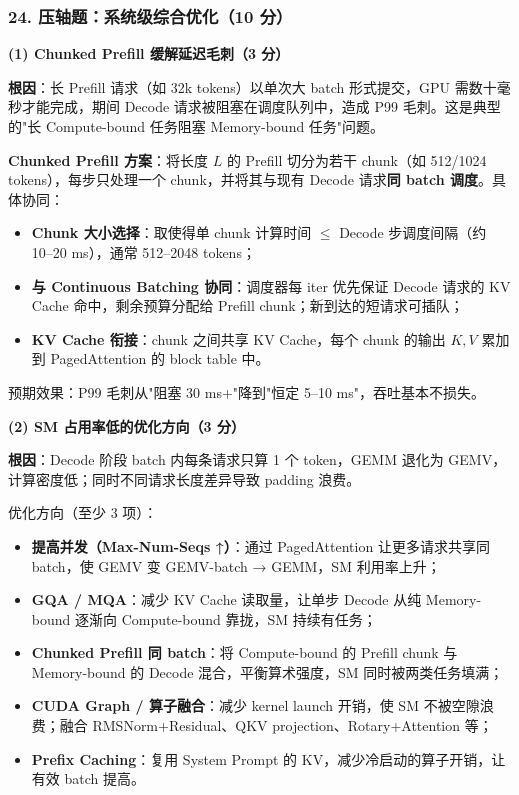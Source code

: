 \documentclass[11pt,a4paper]{article}
\begin{document}
\subsubsection*{24. 压轴题：系统级综合优化（10 分）}

\noindent\textbf{(1) Chunked Prefill 缓解延迟毛刺（3 分）}

\textbf{根因}：长 Prefill 请求（如 32k tokens）以单次大 batch 形式提交，GPU 需数十毫秒才能完成，期间 Decode 请求被阻塞在调度队列中，造成 P99 毛刺。这是典型的"长 Compute-bound 任务阻塞 Memory-bound 任务"问题。

\textbf{Chunked Prefill 方案}：将长度 $L$ 的 Prefill 切分为若干 chunk（如 512/1024 tokens），每步只处理一个 chunk，并将其与现有 Decode 请求\textbf{同 batch 调度}。具体协同：
\begin{itemize}[leftmargin=2em,itemsep=0pt,parsep=0pt,topsep=0pt]
  \item \textbf{Chunk 大小选择}：取使得单 chunk 计算时间 $\leq$ Decode 步调度间隔（约 10--20 ms），通常 512--2048 tokens；
  \item \textbf{与 Continuous Batching 协同}：调度器每 iter 优先保证 Decode 请求的 KV Cache 命中，剩余预算分配给 Prefill chunk；新到达的短请求可插队；
  \item \textbf{KV Cache 衔接}：chunk 之间共享 KV Cache，每个 chunk 的输出 $K,V$ 累加到 PagedAttention 的 block table 中。
\end{itemize}
预期效果：P99 毛刺从"阻塞 30 ms+"降到"恒定 5--10 ms"，吞吐基本不损失。

\noindent\textbf{(2) SM 占用率低的优化方向（3 分）}

\textbf{根因}：Decode 阶段 batch 内每条请求只算 1 个 token，GEMM 退化为 GEMV，计算密度低；同时不同请求长度差异导致 padding 浪费。

优化方向（至少 3 项）：
\begin{itemize}[leftmargin=2em,itemsep=0.2em,parsep=0pt,topsep=0pt]
  \item \textbf{提高并发（Max-Num-Seqs ↑）}：通过 PagedAttention 让更多请求共享同 batch，使 GEMV 变 GEMV-batch → GEMM，SM 利用率上升；
  \item \textbf{GQA / MQA}：减少 KV Cache 读取量，让单步 Decode 从纯 Memory-bound 逐渐向 Compute-bound 靠拢，SM 持续有任务；
  \item \textbf{Chunked Prefill 同 batch}：将 Compute-bound 的 Prefill chunk 与 Memory-bound 的 Decode 混合，平衡算术强度，SM 同时被两类任务填满；
  \item \textbf{CUDA Graph / 算子融合}：减少 kernel launch 开销，使 SM 不被空隙浪费；融合 RMSNorm+Residual、QKV projection、Rotary+Attention 等；
  \item \textbf{Prefix Caching}：复用 System Prompt 的 KV，减少冷启动的算子开销，让有效 batch 提高。
\end{itemize}
\end{document}
